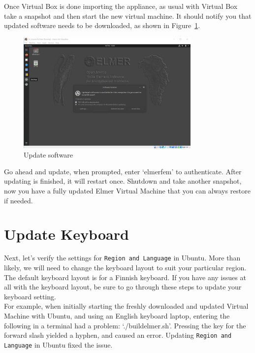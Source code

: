Once Virtual Box is done importing the appliance, as usual with Virtual Box take a snapshot and then start the new virtual machine.  It should notify you that updated software needs to be downloaded, as shown in Figure~\ref{fg:virt-6}.

\begin{figure}[H]
\begin{center}
\includegraphics[width=0.8\textwidth]{virt-6}
\caption{Update software}\label{fg:virt-6}
\end{center}
\end{figure}

Go ahead and update, when prompted, enter `elmerfem' to authenticate.  After updating is finished, it will restart once.  Shutdown and take another snapshot, now you have a fully updated Elmer Virtual Machine that you can always restore if needed.\\

\section{Update Keyboard}

Next, let's verify the settings for \texttt{Region and Language} in Ubuntu.  More than likely, we will need to change the keyboard layout to suit your particular region.  The default keyboard layout is for a Finnish keyboard.  If you have any issues at all with the keyboard layout, be sure to go through these steps to update your keyboard setting.\\

For example, when initially starting the freshly downloaded and updated Virtual Machine with Ubuntu, and using an English keyboard laptop, entering the following in a terminal had a problem:  `./buildelmer.sh'.  Pressing the key for the forward slash yielded a hyphen, and caused an error.  Updating \texttt{Region and Language} in Ubuntu fixed the issue.\\ 

